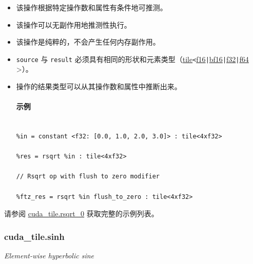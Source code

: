 \documentclass{article}
\begin{document}
\begin{itemize}
\item 该操作根据特定操作数和属性有条件地可推测。
\item 该操作可以无副作用地推测性执行。
\item 该操作是纯粹的，不会产生任何内存副作用。
\item \texttt{source} 与 \texttt{result} 必须具有相同的形状和元素类型（\href{https://docs.nvidia.com/cuda/tile-ir/latest/sections/types.html#type-tile}{tile}\texttt{<}\href{https://docs.nvidia.com/cuda/tile-ir/latest/sections/types.html#subsection-element-types}{f16}\texttt{|}\href{https://docs.nvidia.com/cuda/tile-ir/latest/sections/types.html#subsection-element-types}{bf16}\texttt{|}\href{https://docs.nvidia.com/cuda/tile-ir/latest/sections/types.html#subsection-element-types}{f32}\texttt{|}\href{https://docs.nvidia.com/cuda/tile-ir/latest/sections/types.html#subsection-element-types}{f64} >）。
\item 操作的结果类型可以从其操作数和属性中推断出来。




\paragraph{示例}


\begin{lstlisting}

%in = constant <f32: [0.0, 1.0, 2.0, 3.0]> : tile<4xf32>

%res = rsqrt %in : tile<4xf32>

// Rsqrt op with flush to zero modifier

%ftz_res = rsqrt %in flush_to_zero : tile<4xf32>

\end{lstlisting}



\end{itemize}
请参阅 \href{https://docs.nvidia.com/cuda/tile-ir/latest/sections/appendix.html#example-cuda-tile-rsqrt-0}{cuda\_tile.rsqrt\_0} 获取完整的示例列表。





\subsubsection{cuda\_tile.sinh}


\textit{Element-wise hyperbolic sine}
\end{document}
